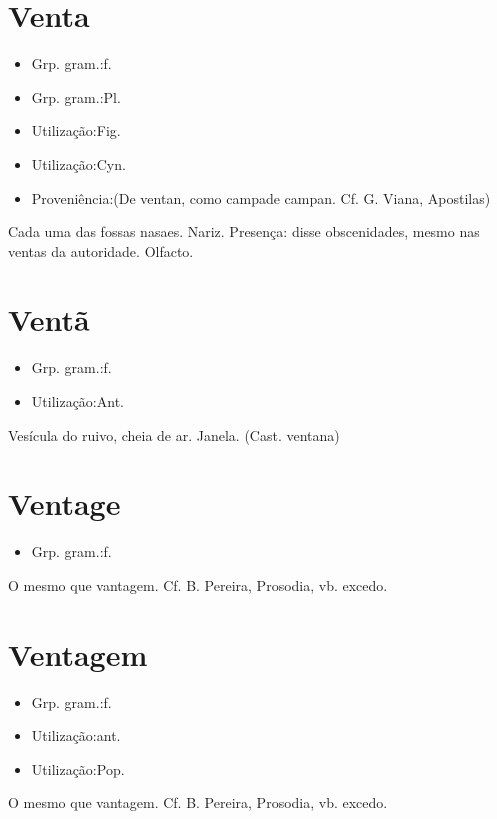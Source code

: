 \documentclass{article}
\begin{document}
\section{Venta}
\begin{itemize}
\item {Grp. gram.:f.}
\end{itemize}
\begin{itemize}
\item {Grp. gram.:Pl.}
\end{itemize}
\begin{itemize}
\item {Utilização:Fig.}
\end{itemize}
\begin{itemize}
\item {Utilização:Cyn.}
\end{itemize}
\begin{itemize}
\item {Proveniência:(De \textunderscore ventan\textunderscore , como \textunderscore campa\textunderscore  de \textunderscore campan\textunderscore . Cf. G. Viana, \textunderscore Apostilas\textunderscore )}
\end{itemize}
Cada uma das fossas nasaes.
Nariz.
Presença: \textunderscore disse obscenidades, mesmo nas ventas da autoridade\textunderscore .
Olfacto.
\section{Ventã}
\begin{itemize}
\item {Grp. gram.:f.}
\end{itemize}
\begin{itemize}
\item {Utilização:Ant.}
\end{itemize}
Vesícula do ruivo, cheia de ar.
Janela.
(Cast. \textunderscore ventana\textunderscore )
\section{Ventage}
\begin{itemize}
\item {Grp. gram.:f.}
\end{itemize}
O mesmo que \textunderscore vantagem\textunderscore . Cf. B. Pereira, \textunderscore Prosodia\textunderscore , vb. \textunderscore excedo\textunderscore .
\section{Ventagem}
\begin{itemize}
\item {Grp. gram.:f.}
\end{itemize}
\begin{itemize}
\item {Utilização:ant.}
\end{itemize}
\begin{itemize}
\item {Utilização:Pop.}
\end{itemize}
O mesmo que \textunderscore vantagem\textunderscore . Cf. B. Pereira, \textunderscore Prosodia\textunderscore , vb. \textunderscore excedo\textunderscore .
\end{document}
